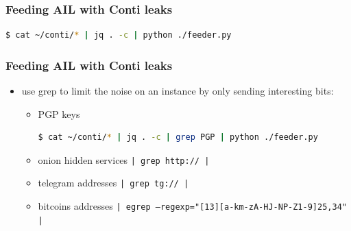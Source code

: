\begin{frame}[fragile]                                                                                                                        
   \frametitle{Feeding AIL with Conti leaks}
	

	\begin{lstlisting}[language=bash]
	$ cat ~/conti/* | jq . -c | python ./feeder.py
	\end{lstlisting}

\end{frame}

\begin{frame}[fragile]                                                                                                                        

\frametitle{Feeding AIL with Conti leaks}

    \begin{itemize}
    \item use grep to limit the noise on an instance by only sending interesting bits:
        \begin{itemize}
        \item PGP keys
\begin{lstlisting}[language=bash]
$ cat ~/conti/* | jq . -c | grep PGP | python ./feeder.py
\end{lstlisting}
        \item onion hidden services \texttt{| grep http:// |}
        \item telegram addresses \texttt{| grep tg:// | }
        \item bitcoins addresses \texttt{| egrep --regexp="[13][a-km-zA-HJ-NP-Z1-9]{25,34}" | }

        \end{itemize}
    \end{itemize}

\end{frame}
